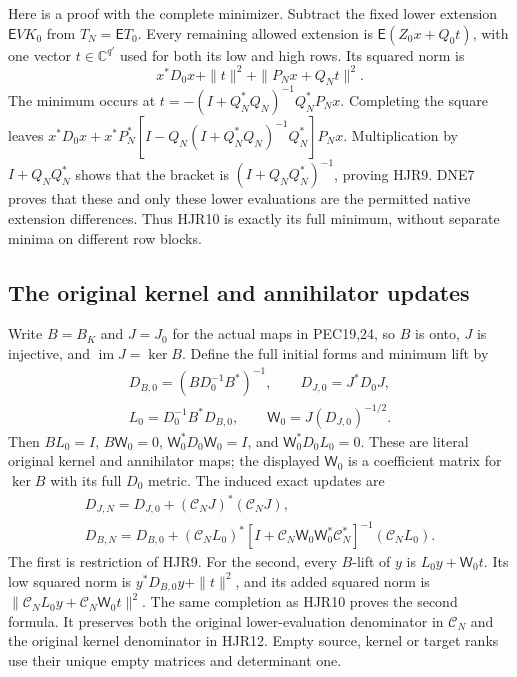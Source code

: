 \documentclass[11pt,a4paper]{article}
\begin{document}
Here is a proof with the complete minimizer. Subtract the fixed
lower extension $\mathsf E VK_0$ from $T_N=\mathsf E T_0$.
Every remaining allowed extension is
$\mathsf E(Z_0x+Q_0t)$, with one vector $t\in\mathbb C^{q'}$
used for both its low and high rows. Its squared norm is
\[
 x^*D_0x+\|t\|^2+\|P_Nx+Q_Nt\|^2 .
 \tag{HJR10}
\]
The minimum occurs at
$t=-(I+Q_N^*Q_N)^{-1}Q_N^*P_Nx$.
Completing the square leaves
$x^*D_0x+x^*P_N^*[I-Q_N(I+Q_N^*Q_N)^{-1}Q_N^*]P_Nx$.
Multiplication by $I+Q_NQ_N^*$ shows that the bracket is
$(I+Q_NQ_N^*)^{-1}$, proving HJR9. DNE7 proves that these
and only these lower evaluations are the permitted native
extension differences. Thus HJR10 is exactly its full
minimum, without separate minima on different row blocks.

\subsection{The original kernel and annihilator updates}

Write $B=B_K$ and $J=J_0$ for the actual maps in PEC19,24,
so $B$ is onto, $J$ is injective, and
$\operatorname{im}J=\ker B$. Define the full initial forms
and minimum lift by
\[
 \begin{gathered}
 D_{B,0}=(BD_0^{-1}B^*)^{-1},\qquad
 D_{J,0}=J^*D_0J,\\
 L_0=D_0^{-1}B^*D_{B,0},\qquad
 \mathsf W_0=J(D_{J,0})^{-1/2}.
 \end{gathered}\tag{HJR11}
\]
Then $BL_0=I$, $B\mathsf W_0=0$,
$\mathsf W_0^*D_0\mathsf W_0=I$, and $\mathsf W_0^*D_0L_0=0$.
These are literal original kernel and annihilator maps;
the displayed $\mathsf W_0$ is a coefficient matrix for
$\ker B$ with its full $D_0$ metric.
The induced exact updates are
\[
 \begin{gathered}
 D_{J,N}=D_{J,0}+(\mathcal C_NJ)^*(\mathcal C_NJ),\\
 D_{B,N}=D_{B,0}
 +(\mathcal C_NL_0)^*
  [I+\mathcal C_N\mathsf W_0\mathsf W_0^*\mathcal C_N^*]^{-1}
                                      (\mathcal C_NL_0).
 \end{gathered}\tag{HJR12}
\]
The first is restriction of HJR9. For the second, every
$B$-lift of $y$ is $L_0y+\mathsf W_0t$. Its low squared
norm is $y^*D_{B,0}y+\|t\|^2$, and its added squared norm
is $\|\mathcal C_NL_0y+\mathcal C_N\mathsf W_0t\|^2$.
The same completion as HJR10 proves the second formula.
It preserves both the original lower-evaluation denominator
in $\mathcal C_N$ and the original kernel denominator in HJR12.
Empty source, kernel or target ranks use their unique empty
matrices and determinant one.
\end{document}
